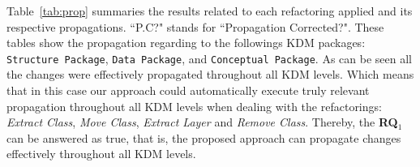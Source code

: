 Table~\ref{tab:prop} summaries the results related to each refactoring applied and its respective propagations. ``P.C?" stands for ``Propagation Corrected?". These tables show the propagation regarding to the followings KDM packages: \texttt{Structure Package}, \texttt{Data Package}, and \texttt{Conceptual Package}. As can be seen all the changes were effectively propagated throughout all KDM levels. Which means that in this case our approach could automatically execute truly relevant propagation throughout all KDM levels when dealing with the refactorings: \textit{Extract Class}, \textit{Move Class}, \textit{Extract Layer} and \textit{Remove Class}. Thereby, the \textbf{RQ$_1$} can be answered as true, that is, the proposed approach can propagate changes effectively throughout all KDM levels.
